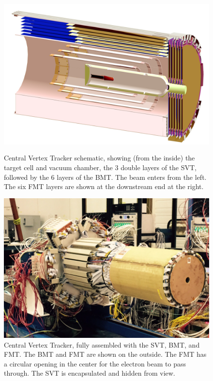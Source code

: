 \documentclass[final,3p,twocolumn]{elsarticle}
\begin{document}
\begin{figure}[t!]
\centerline{\includegraphics[width=1.0\columnwidth]{CVT-schematics.png}}
\caption{Central Vertex Tracker schematic, showing (from the inside) the target cell and vacuum chamber, the
  3 double layers of the SVT, followed by the 6 layers of the BMT. The beam enters from the left. The six FMT
  layers are shown at the downstream end at the right.}
\label{CVT}
\vspace{1.0cm}
\centerline{\includegraphics[width=1.0\columnwidth]{CVT.png}}
\caption{Central Vertex Tracker, fully assembled with the SVT, BMT, and FMT. The BMT and FMT are shown on
  the outside. The FMT has a circular opening in the center for the electron beam to pass through. The SVT is
  encapsulated and hidden from view.}
\label{CVT-FMT}
\end{figure}
\end{document}
